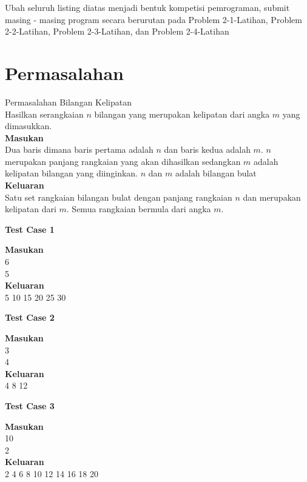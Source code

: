 Ubah seluruh listing diatas menjadi bentuk kompetisi pemrograman, submit masing - masing program secara berurutan pada Problem 2-1-Latihan, Problem 2-2-Latihan, Problem 2-3-Latihan, dan Problem 2-4-Latihan

\newpage
\section{Permasalahan}
\begin{permasalahan}{Permasalahan Bilangan Kelipatan}\\
\label{prob:bilanganKelipatan}
	Hasilkan serangkaian $n$ bilangan yang merupakan kelipatan dari angka $m$ yang dimasukkan.\\
	\textbf{Masukan}\\
	Dua baris dimana baris pertama adalah $n$ dan baris kedua adalah $m$. $n$ merupakan panjang rangkaian yang akan dihasilkan sedangkan $m$ adalah kelipatan bilangan yang diinginkan. $n$ dan $m$ adalah bilangan bulat\\
	\textbf{Keluaran}\\
	Satu set rangkaian bilangan bulat dengan panjang rangkaian $n$ dan merupakan kelipatan dari $m$. Semua rangkaian bermula dari angka $m$.\\
	\begin{center}
	\textbf{Test Case 1}\\
	\end{center}
	\textbf{Masukan}\\
	6\\
	5\\
	\textbf{Keluaran}\\
	5 10 15 20 25 30 \\
	\begin{center}
	\textbf{Test Case 2}\\
	\end{center}
	\textbf{Masukan}\\
	3\\
	4\\
	\textbf{Keluaran}\\
	4 8 12 \\
	\begin{center}
	\textbf{Test Case 3}\\
	\end{center}
	\textbf{Masukan}\\
	10\\
	2\\
	\textbf{Keluaran}\\
	2 4 6 8 10 12 14 16 18 20\\
	

\end{permasalahan}

